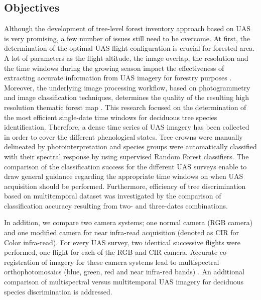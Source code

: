 \documentclass[remotesensing,article,submit,moreauthors,pdftex,12pt,a4paper]{mdpi} %
\begin{document}

\subsection{Objectives}

Although the development of tree-level forest inventory approach based on UAS is very promising, a few number of issues still need to be overcome. 
At first, the determination of the optimal UAS flight configuration is crucial for forested area. 
A lot of parameters as the flight altitude, the image overlap, the resolution and the time windows during the growing season impact the effectiveness of extracting accurate information from UAS imagery for forestry purposes \cite{dandois_high_2013}. 
Moreover, the underlying image processing workflow, based on photogrammetry and image classification techniques, determines the quality of the resulting high resolution thematic forest map \cite{lisein_photogrammetric_2013}.
This research focused on the determination of the most efficient single-date time windows for deciduous tree species identification. 
Therefore, a dense time series of UAS imagery has been collected in order to cover the different phenological states. 
Tree crowns were manually delineated by photointerpretation and species groups were automatically classified with their spectral response by using supervised Random Forest classifiers. 
The comparison of the classification success for the different UAS surveys enable to draw general guidance regarding the appropriate time windows on when UAS acquisition should be performed. 
Furthermore, efficiency of tree discrimination based on multitemporal dataset was investigated by the comparison of classification accuracy resulting from two- and three-dates combinations.
 
In addition, we compare two camera systems; one normal camera (RGB camera) and one modified camera for near infra-read acquisition (denoted as CIR for Color infra-read). 
For every UAS survey, two identical successive flights were performed, one flight for each of the RGB and CIR camera. 
Accurate co-registration of imagery for these camera systems lead to multispectral orthophotomosaics (blue, green, red and near infra-red bands) \cite{key_comparison_2001}. 
An additional comparison of multispectral versus multitemporal UAS imagery for deciduous species discrimination is addressed.


 

\end{document}
